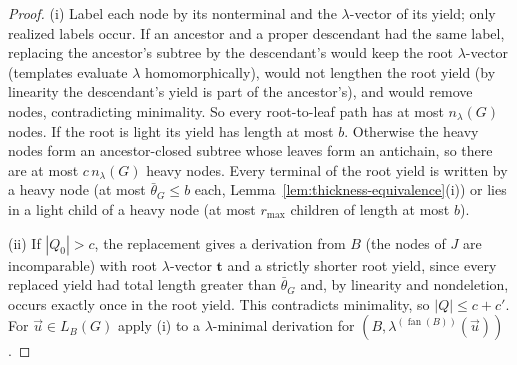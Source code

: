 \documentclass[11pt]{article}
\numberwithin{equation}{section}
\theoremstyle{plain}
\theoremstyle{definition}
\theoremstyle{remark}
\newcommand{\tuple}[1]{\vec{#1}}
\newcommand{\fan}{\operatorname{fan}}
\theoremstyle{plain}
\begin{document}
\begin{proof}
(i) Label each node by its nonterminal and the $\lambda$-vector of its yield; only
realized labels occur.  If an ancestor and a proper descendant had the same
label, replacing the ancestor's subtree by the descendant's would keep the root
$\lambda$-vector (templates evaluate $\lambda$ homomorphically), would not
lengthen the root yield (by linearity the descendant's yield is part of the
ancestor's), and would remove nodes, contradicting minimality.  So every
root-to-leaf path has at most $n_\lambda(G)$ nodes.  If the root is light its yield has
length at most $b$.  Otherwise the heavy nodes form an ancestor-closed subtree
whose leaves form an antichain, so there are at most $c\,n_\lambda(G)$ heavy nodes.
Every terminal of the root yield is written by a heavy node (at most
$\bar\theta_G\le b$ each, Lemma~\ref{lem:thickness-equivalence}(i)) or lies in a
light child of a heavy node (at most $r_{\max}$ children of length at most $b$).

(ii) If $|Q_0|>c$, the replacement gives a derivation from $B$ (the nodes of $J$ are
incomparable) with root $\lambda$-vector $\mathbf t$ and a strictly shorter root yield,
since every replaced yield had total length greater than $\bar\theta_G$ and, by
linearity and nondeletion, occurs exactly once in the root yield.  This contradicts
minimality, so $|Q|\le c+c'$.  For $\tuple u\in L_B(G)$ apply (i) to a $\lambda$-minimal
derivation for $(B,\lambda^{(\fan(B))}(\tuple u))$.
\end{proof}
\end{document}
